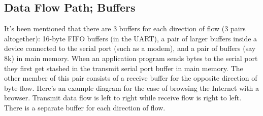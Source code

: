 \documentclass[11pt, twosides, titlepage]{article}
\begin{document}
    \subsection{Data Flow Path; Buffers}

        It's been mentioned that there are 3 buffers for each direction of flow (3 pairs altogether): 16-byte FIFO buffers (in the UART), a pair of larger buffers inside a device connected to the serial port (such as a modem), and a pair of buffers (say 8k) in main memory. When an application program sends bytes to the serial port they first get stashed in the transmit serial port buffer in main memory. The other member of this pair consists of a receive buffer for the opposite direction of byte-flow. Here's an example diagram for the case of browsing the Internet with a browser. Transmit data flow is left to right while receive flow is right to left. There is a separate buffer for each direction of flow.
\end{document}
